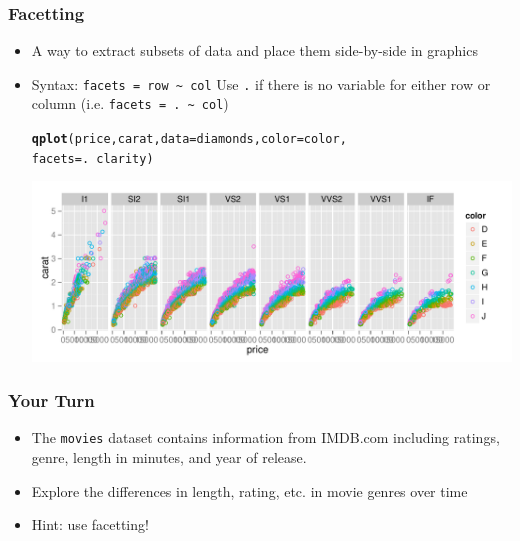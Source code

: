 \documentclass{beamer}\usepackage[]{graphicx}\usepackage[]{color}
\makeatletter
\newcommand{\hlopt}[1]{\textcolor[rgb]{0,0,0}{#1}}%
\newcommand{\hlstd}[1]{\textcolor[rgb]{0.345,0.345,0.345}{#1}}%
\newcommand{\hlkwc}[1]{\textcolor[rgb]{0.333,0.667,0.333}{#1}}%
\newcommand{\hlkwd}[1]{\textcolor[rgb]{0.737,0.353,0.396}{\textbf{#1}}}%
\newenvironment{kframe}{%
 \def\at@end@of@kframe{}%
 \ifinner\ifhmode%
  \def\at@end@of@kframe{\end{minipage}}%
  \begin{minipage}{\columnwidth}%
 \fi\fi%
 \def\FrameCommand##1{\hskip\@totalleftmargin \hskip-\fboxsep
 \colorbox{shadecolor}{##1}\hskip-\fboxsep
     \hskip-\linewidth \hskip-\@totalleftmargin \hskip\columnwidth}%
 \MakeFramed {\advance\hsize-\width
   \@totalleftmargin\z@ \linewidth\hsize
   \@setminipage}}%
 {\par\unskip\endMakeFramed%
 \at@end@of@kframe}
\newenvironment{knitrout}{}{} %
\makeatother
\begin{document}
\begin{frame}[fragile]
\frametitle{Facetting}
\begin{itemize}
\item A way to extract subsets of data and place them side-by-side in graphics
\item Syntax: \verb#facets = row ~ col# Use \texttt{.} if there is no variable for either row or column (i.e. \verb#facets = . ~ col#)
\begin{knitrout}\scriptsize
{}\color{fgcolor}\begin{kframe}
\begin{alltt}
\hlkwd{qplot}\hlstd{(price, carat,} \hlkwc{data}\hlstd{=diamonds,} \hlkwc{color}\hlstd{=color,}
      \hlkwc{facets} \hlstd{= .} \hlopt{~} \hlstd{clarity)}
\end{alltt}
\end{kframe}
\end{knitrout}
\begin{knitrout}\footnotesize
{}\color{fgcolor}

{\centering \includegraphics[width=\linewidth]{figure/diamondsdemo2} 

}



\end{knitrout}
\end{itemize}
\end{frame}


\begin{frame}
\frametitle{Your Turn}
\begin{itemize}
\item The \texttt{movies} dataset contains information from IMDB.com including ratings, genre, length in minutes, and year of release. \medskip
\item Explore the differences in length, rating, etc. in movie genres over time \medskip
\item Hint: use facetting!
\end{itemize}
\end{frame}
\end{document}
